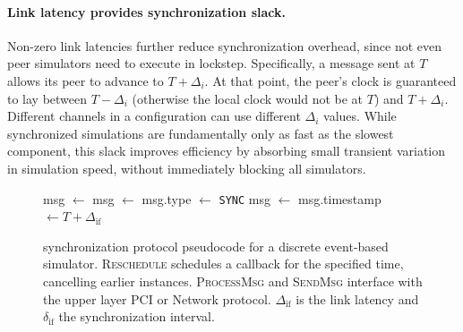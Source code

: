 \paragraph{Link latency provides synchronization slack.}
Non-zero link latencies further reduce synchronization overhead, since
not even peer simulators need to execute in lockstep.
%
Specifically, a message sent at $T$ allows its peer to advance to $T +
\Delta_i$.
%
At that point, the peer's clock is guaranteed to lay between $T -
\Delta_i$ (otherwise the local clock would not be at $T$) and
$T + \Delta_i$.
%
Different channels in a \sysname configuration can use different
$\Delta_i$ values.
%
While synchronized simulations are fundamentally only as fast as the
slowest component, this slack improves efficiency by absorbing small
transient variation in simulation speed, without immediately blocking
all simulators.

\begin{figure}%
  \begin{minipage}{\linewidth}
  \begin{algorithmic}[0]%
        \State {}
        \State msg $\gets$ 
        \State {}
      \EndFor
    \EndProcedure
      \State msg $\gets$ 
      \State msg.type $\gets$ \texttt{SYNC}
      \State {}
    \EndProcedure
        \State {}
      \EndIf
      \State msg $\gets$ 
      \State {}
    \EndProcedure
      \State msg.timestamp $\gets T + \Delta_{\textrm{if}}$
      \State {}
      \State {}
    \EndProcedure
  \end{algorithmic}%
\end{minipage}%
\caption{\sysname synchronization protocol pseudocode for a
    discrete event-based simulator.
    \textsc{Reschedule} schedules a callback for the specified time,
    cancelling earlier instances.
    \textsc{ProcessMsg} and \textsc{SendMsg} interface with the
    upper layer PCI or Network protocol. $\Delta_\textrm{if}$ is the
    link latency and $\delta_\textrm{if}$ the synchronization
    interval.}%
\label{fig:sync-proto}%
%
\end{figure}


